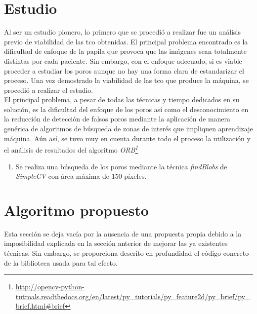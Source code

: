\section{Estudio}
Al ser un estudio pionero, lo primero que se procedió a realizar fue
un análisis previo de viabilidad de las \gls{tco} obtenidas. El
principal problema encontrado es la dificultad de enfoque de la papila
que provoca que las imágenes sean totalmente distintas por cada
paciente. Sin embargo, con el enfoque adecuado, si es viable proceder
a estudiar los poros aunque no hay una forma clara de estandarizar el
proceso. Una vez demostrado la viabilidad de las \gls{tco} que produce
la máquina, se procedió a realizar el estudio.\\
El principal problema, a pesar de todas las técnicas y tiempo
dedicados en su solución, es la dificultad del enfoque de los poros
así como el desconocimiento en la reducción de detección de falsos
poros mediante la aplicación de manera genérica de algoritmos de
búsqueda de zonas de interés que impliquen
aprendizaje máquina. Aún así, se tuvo muy en cuenta durante todo el
proceso la utilización y el análisis de resultados del algoritmo
\emph{\gls{ORB}\footnote{\url{http://opencv-python-tutroals.readthedocs.org/en/latest/py\_tutorials/py\_feature2d/py\_brief/py\_brief.html\#brief}}\cite{orb-bib}}
\begin{enumerate}
\item Se realiza una búsqueda de los poros mediante la técnica
  \emph{findBlobs} de \emph{SimpleCV} con área máxima de $150$
  píxeles.
\end{enumerate}

\section{Algoritmo propuesto}
Esta sección se deja vacía por la ausencia de una propuesta propia
debido a la imposibilidad explicada en la sección anterior de mejorar
las ya existentes técnicas. Sin embargo, se proporciona descrito en
profundidad el código concreto de la biblioteca usada para tal efecto.
